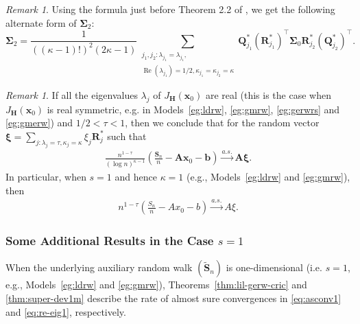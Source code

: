 \documentclass[12pt]{amsart}
\theoremstyle{plain}
\theoremstyle{remark}
\newtheorem{remark}[theorem]{Remark}
\numberwithin{equation}{section}
\begin{document}
\begin{remark}\label{rem:new3}
    Using the formula just before Theorem 2.2 of \cite{zhang2016central}, we get the following alternate form of $\boldsymbol{\Sigma}_2$:
    \[
      \boldsymbol{\Sigma}_2 = \frac{1}{((\kappa-1)!)^2(2\kappa-1)}\sum_{\substack{j_1, j_2 : \lambda_{j_1 } = \lambda_{j_1}, \\ \operatorname{Re}\left(\lambda_{j_1}\right) = 1/2, \kappa_{j_1} = \kappa_{j_2} = \kappa}} \boldsymbol{Q}^*_{j_1} \left(\boldsymbol{R}^*_{{j_1}}\right)^{\top} \boldsymbol{\Sigma}_0 \boldsymbol{R}^*_{{j_2}}\left(\boldsymbol{Q}^*_{{j_2}}\right)^{\top}.
    \]
\end{remark}

\begin{remark}\label{rem:sd}
 If all the eigenvalues $\lambda_j$ of $J_{\boldsymbol{H}}\left(\boldsymbol{x}_0\right)$ are real (this is the case when $J_{\boldsymbol{H}}\left(\boldsymbol{x}_0\right)$ is real symmetric, e.g. in Models~\ref{eg:ldrw}, \ref{eg:gmrw}, \ref{eg:gerwrs} and \ref{eg:gmerw}) and $1/2 < \tau < 1$, then we conclude that for the {random vector $\boldsymbol{\xi} = \sum_{j:\lambda_j=\tau, \kappa_j=\kappa} \xi_j \boldsymbol{R}^*_j$} such that
 \begin{align}\label{eq:re-eig}
    \frac{n^{1-\tau}}{(\log n)^{{\kappa} - 1}}\left(\frac{\boldsymbol{S}_n}{n} - \boldsymbol{A}\boldsymbol{x}_0 - \boldsymbol{b}\right) \stackrel{a.s.}{\to}\boldsymbol{A}{\boldsymbol{\xi}}.
\end{align}
In particular, when $s = 1$ and hence $\kappa = 1$ (e.g., Models~\ref{eg:ldrw} and \ref{eg:gmrw}), then 
\begin{align}\label{eq:re-eig1}
   {n^{1-\tau}}\left(\frac{{S}_n}{n} -{A}{x}_0 - {b}\right) \stackrel{a.s.}{\to}{A}{\xi}.
\end{align}
\end{remark}

\subsubsection{Some Additional Results in the Case $s=1$} When the underlying auxiliary random walk $(\boldsymbol{\widetilde{S}}_n)$ is one-dimensional (i.e. $s = 1$, e.g., Models~\ref{eg:ldrw} and \ref{eg:gmrw}), Theorems~\ref{thm:lil-gerw-cric} and \ref{thm:super-dev1m} describe the rate of almost sure convergences in \eqref{eq:asconv1} and \eqref{eq:re-eig1}, respectively. 
\end{document}
